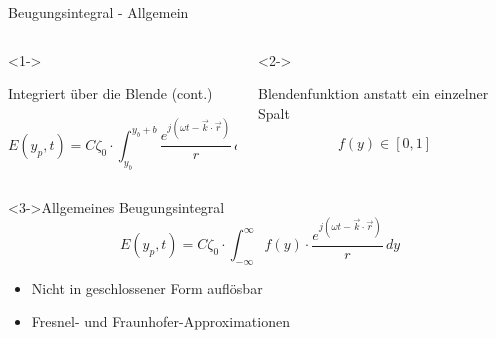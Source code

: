 \begin{frame}{Beugungsintegral - Allgemein}
    \begin{columns}
        \begin{column}[t, onlytextwidth]{0.475\textwidth}
            \begin{block}<1->{\strut Integriert über die Blende (cont.)}
                \begin{equation*}
                    E(y_p, t)
                    =
                    C\zeta_0 \cdot \int_{y_b}^{y_b+b}\frac{e^{j(\omega t - \vec{k}\cdot\vec{r})}}{r} \,dy
                    \end{equation*}
            \end{block}
        \end{column}
        \begin{column}[t, onlytextwidth]{0.475\textwidth}
            \begin{block}<2->{\strut Blendenfunktion anstatt ein einzelner Spalt}
                \begin{equation*}
                    f(y)
                    \in
                    [0, 1]
                    \end{equation*}
            \end{block}
        \end{column}
    \end{columns}
    \begin{exampleblock}<3->{Allgemeines Beugungsintegral}
        \begin{equation*}
            E(y_p, t)
            =
            C\zeta_0 \cdot \int_{-\infty}^{\infty}f(y)\cdot\frac{e^{j(\omega t - \vec{k}\cdot\vec{r})}}{r} \,dy
        \end{equation*}
        \begin{itemize}
            \item<4-> \textcolor{alert}{Nicht in geschlossener Form auflösbar}
            \item<5-> Fresnel- und Fraunhofer-Approximationen
        \end{itemize}
    \end{exampleblock}
\end{frame}

